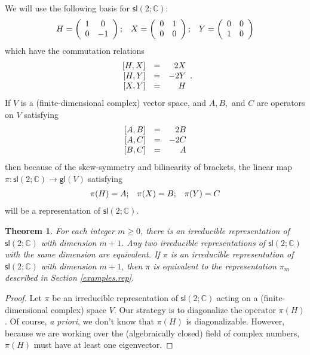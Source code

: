 \documentclass[12pt]{amsbook}
\theoremstyle{plain}
\newtheorem{theorem}{Theorem}
\numberwithin{equation}{chapter}
\numberwithin{theorem}{chapter}
\begin{document}
We will use the following basis for $\mathsf{sl}(2;\mathbb{C})$:
\[%
\begin{array}
[c]{ccc}%
H=\left(
\begin{array}
[c]{cc}%
1 & 0\\
0 & -1
\end{array}
\right)  ; & X=\left(
\begin{array}
[c]{cc}%
0 & 1\\
0 & 0
\end{array}
\right)  ; & Y=\left(
\begin{array}
[c]{cc}%
0 & 0\\
1 & 0
\end{array}
\right)
\end{array}
\]
which have the commutation relations
\[%
\begin{array}
[c]{rrr}%
\lbrack H,X] & = & 2X\\
\lbrack H,Y] & = & -2Y\\
\lbrack X,Y] & = & H
\end{array}
\text{.}%
\]
If $V$ is a (finite-dimensional complex) vector space, and $A,B,$ and $C$ are
operators on $V$ satisfying
\[%
\begin{array}
[c]{rrr}%
\lbrack A,B] & = & 2B\\
\lbrack A,C] & = & -2C\\
\lbrack B,C] & = & A
\end{array}
\]
then because of the skew-symmetry and bilinearity of brackets, the linear map
$\pi:\mathsf{sl}(2;\mathbb{C})\rightarrow\mathsf{gl}(V)$ satisfying
\[%
\begin{array}
[c]{ccc}%
\pi(H)=A; & \pi(X)=B; & \pi(Y)=C
\end{array}
\]
will be a representation of $\mathsf{sl}(2;\mathbb{C})$.

\begin{theorem}
\label{classify.rep}For each integer $m\geq0$, there is an irreducible
representation of $\mathsf{sl}(2;\mathbb{C})$ with dimension $m+1$. Any two
irreducible representations of $\mathsf{sl}(2;\mathbb{C})$ with the same
dimension are equivalent. If $\pi$ is an irreducible representation of
$\mathsf{sl}(2;\mathbb{C})$ with dimension $m+1$, then $\pi$ is equivalent to
the representation $\pi_{m}$ described in Section \ref{examples.rep}.
\end{theorem}

\begin{proof}
Let $\pi$ be an irreducible representation of $\mathsf{sl}(2;\mathbb{C})$
acting on a (finite-dimensional complex) space $V$. Our strategy is to
diagonalize the operator $\pi(H)$. Of course, \textit{a priori}, we don't know
that $\pi(H)$ is diagonalizable. However, because we are working over the
(algebraically closed) field of complex numbers, $\pi(H)$ must have at least
one eigenvector.
\end{proof}
\end{document}
